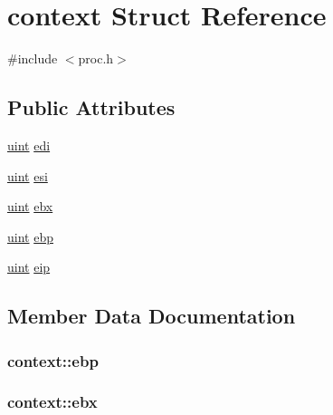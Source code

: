 \hypertarget{structcontext}{}\section{context Struct Reference}
\label{structcontext}


{\ttfamily \#include $<$proc.\+h$>$}

\subsection*{Public Attributes}
\begin{DoxyCompactItemize}
\item 
\hyperlink{custom__types_8h_a91ad9478d81a7aaf2593e8d9c3d06a14}{uint} \hyperlink{structcontext_a9c926d583d00a615327b9b4a8fe0ab63}{edi}
\item 
\hyperlink{custom__types_8h_a91ad9478d81a7aaf2593e8d9c3d06a14}{uint} \hyperlink{structcontext_a9596ea769c8681490bbc67fd1b0abc92}{esi}
\item 
\hyperlink{custom__types_8h_a91ad9478d81a7aaf2593e8d9c3d06a14}{uint} \hyperlink{structcontext_ab1dd54ca1266e38df5943750224cd8d5}{ebx}
\item 
\hyperlink{custom__types_8h_a91ad9478d81a7aaf2593e8d9c3d06a14}{uint} \hyperlink{structcontext_ac9640ddc2e90e4213ba9847bbe1b0e57}{ebp}
\item 
\hyperlink{custom__types_8h_a91ad9478d81a7aaf2593e8d9c3d06a14}{uint} \hyperlink{structcontext_a0cfb49e5b03fd7bf12fa79d1a42be935}{eip}
\end{DoxyCompactItemize}


\subsection{Member Data Documentation}
\subsubsection[{\texorpdfstring{ebp}{ebp}}]{ context\+::ebp}\hypertarget{structcontext_ac9640ddc2e90e4213ba9847bbe1b0e57}{}\label{structcontext_ac9640ddc2e90e4213ba9847bbe1b0e57}
\subsubsection[{\texorpdfstring{ebx}{ebx}}]{ context\+::ebx}\hypertarget{structcontext_ab1dd54ca1266e38df5943750224cd8d5}{}\label{structcontext_ab1dd54ca1266e38df5943750224cd8d5}
